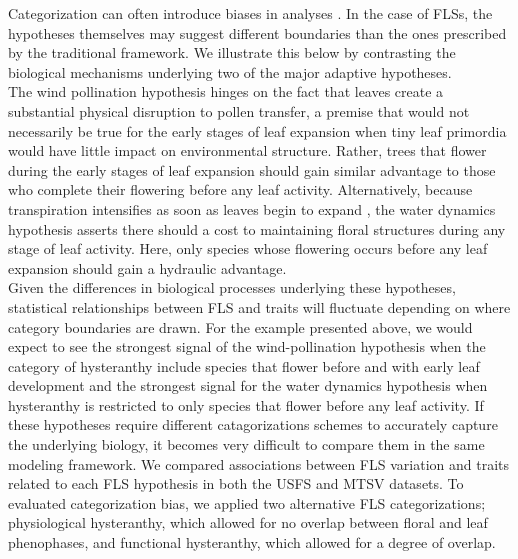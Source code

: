 \documentclass{article}
\begin{document}
\noindent Categorization can often introduce biases in analyses \citep{Naggara2011,Royston2006}. In the case of FLSs, the hypotheses themselves may suggest different boundaries than the ones prescribed by the traditional framework. We illustrate this below by contrasting the biological mechanisms underlying two of the major adaptive hypotheses.\\

\noindent The wind pollination hypothesis hinges on the fact that leaves create a substantial physical disruption to pollen transfer, a premise that would not necessarily be true for the early stages of leaf expansion when tiny leaf primordia would have little impact on environmental structure. Rather, trees that flower during the early stages of leaf expansion should gain similar advantage to those who complete their flowering before any leaf activity. Alternatively, because transpiration intensifies as soon as leaves begin to expand \citep{Breda1996,Wang2018}, the water dynamics hypothesis asserts there should a cost to maintaining floral structures during any stage of leaf activity. Here, only species whose flowering occurs before any leaf expansion should gain a hydraulic advantage.\\ 

\noindent Given the differences in biological processes underlying these hypotheses, statistical relationships between FLS and traits will fluctuate depending on where category boundaries are drawn. For the example presented above, we would expect to see the strongest signal of the wind-pollination hypothesis when the category of hysteranthy include species that flower before and with early leaf development and the strongest signal for the water dynamics hypothesis when hysteranthy is restricted to only species that flower before any leaf activity. If these hypotheses require different catagorizations schemes to accurately capture the underlying biology, it becomes very difficult to compare them in the same modeling framework. We compared associations between FLS variation and traits related to each FLS hypothesis in both the USFS and MTSV datasets. To evaluated categorization bias, we applied two alternative FLS categorizations; physiological hysteranthy, which allowed for no overlap between floral and leaf phenophases, and functional hysteranthy, which allowed for a degree of overlap.\\ 
\end{document}
